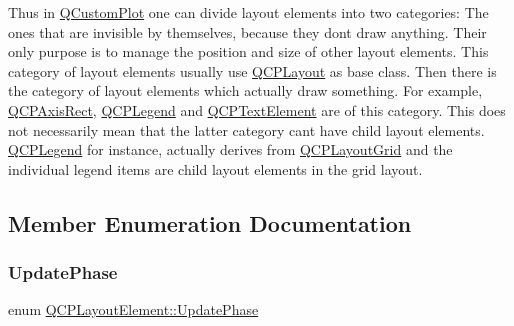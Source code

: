 Thus in \hyperlink{class_q_custom_plot}{Q\+Custom\+Plot} one can divide layout elements into two categories\+: The ones that are invisible by themselves, because they don\textquotesingle{}t draw anything. Their only purpose is to manage the position and size of other layout elements. This category of layout elements usually use \hyperlink{class_q_c_p_layout}{Q\+C\+P\+Layout} as base class. Then there is the category of layout elements which actually draw something. For example, \hyperlink{class_q_c_p_axis_rect}{Q\+C\+P\+Axis\+Rect}, \hyperlink{class_q_c_p_legend}{Q\+C\+P\+Legend} and \hyperlink{class_q_c_p_text_element}{Q\+C\+P\+Text\+Element} are of this category. This does not necessarily mean that the latter category can\textquotesingle{}t have child layout elements. \hyperlink{class_q_c_p_legend}{Q\+C\+P\+Legend} for instance, actually derives from \hyperlink{class_q_c_p_layout_grid}{Q\+C\+P\+Layout\+Grid} and the individual legend items are child layout elements in the grid layout. 

\subsection{Member Enumeration Documentation}
\mbox{\label{class_q_c_p_layout_element_a0d83360e05735735aaf6d7983c56374d}} 
\subsubsection{\texorpdfstring{Update\+Phase}{UpdatePhase}}
{\footnotesize\ttfamily enum \hyperlink{class_q_c_p_layout_element_a0d83360e05735735aaf6d7983c56374d}{Q\+C\+P\+Layout\+Element\+::\+Update\+Phase}}

